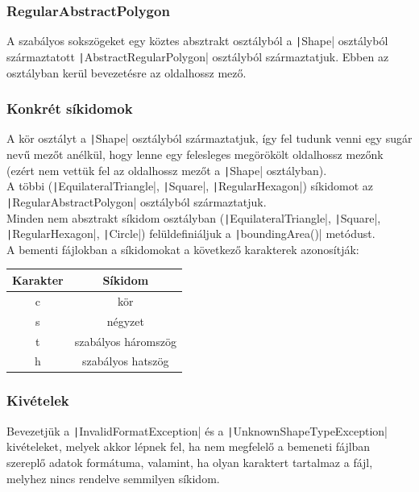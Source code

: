 \documentclass[12pt,a4paper]{article}
\theoremstyle{definition}
\begin{document}
	\subsubsection{RegularAbstractPolygon}
	A szabályos sokszögeket egy köztes absztrakt osztályból a \texttt|Shape| osztályból származtatott \texttt|AbstractRegularPolygon| osztályból származtatjuk. Ebben az osztályban kerül bevezetésre az oldalhossz mező.
	
	\subsubsection{Konkrét síkidomok}
	A kör osztályt a \texttt|Shape| osztályból származtatjuk, így fel tudunk venni egy sugár nevű mezőt anélkül, hogy lenne egy felesleges megörökölt oldalhossz mezőnk (ezért nem vettük fel az oldalhossz mezőt a \texttt|Shape| osztályban).
	\\[8pt]
	A többi (\texttt|EquilateralTriangle|, \texttt|Square|, \texttt|RegularHexagon|) síkidomot az \texttt|RegularAbstractPolygon| osztályból származtatjuk.
	\\[8pt]
	Minden nem absztrakt síkidom osztályban (\texttt|EquilateralTriangle|, \texttt|Square|, \texttt|RegularHexagon|, \texttt|Circle|) felüldefiniáljuk a  \texttt|boundingArea()| metódust.
	\\[18pt]
	A bementi fájlokban a síkidomokat a következő karakterek azonosítják:
	\begin{center}
	\begin{tabular}{|c|c|}
		\hline
		Karakter & Síkidom \\
		\hline
		c & kör \\
		\hline
		s & négyzet \\
		\hline
		t & szabályos háromszög \\
		\hline
		h & szabályos hatszög \\
		\hline
	\end{tabular}
	\end{center}
	\subsubsection{Kivételek}
	Bevezetjük a \texttt|InvalidFormatException| és a \texttt|UnknownShapeTypeException| kivételeket, melyek akkor lépnek fel, ha nem megfelelő a bemeneti fájlban szereplő adatok formátuma, valamint, ha olyan karaktert tartalmaz a fájl, melyhez nincs rendelve semmilyen síkidom. 
\end{document}
